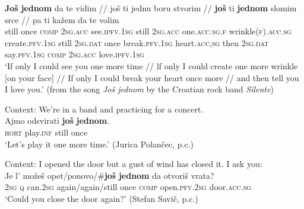 \begin{exe}
	\ex \gll
\textbf{Još} \textbf{jednom} da te vidim // još ti jednu boru stvorim // \textbf{još} ti \textbf{jednom} slomim srce // pa ti kažem da te volim\\
still once \textsc{comp} 2\textsc{sg}.\textsc{acc} see.\textsc{ipfv}.1\textsc{sg} {} still 2\textsc{sg}.\textsc{acc} one.\textsc{acc}.\textsc{sg}.\textsc{f} wrinkle(\textsc{f}).\textsc{acc}.\textsc{sg} create.\textsc{pfv}.1\textsc{sg} {} still 2\textsc{sg}.\textsc{dat} once break.\textsc{pfv}.1\textsc{sg} heart.\textsc{acc},\textsc{sg} {} then 2\textsc{sg}.\textsc{dat} say.\textsc{pfv}.1\textsc{sg} \textsc{comp} 2\textsc{sg}.\textsc{acc} love.\textsc{ipfv}.1\textsc{sg}\\
\glt \lq If only I could see you one more time // lf only I could create one more wrinkle [on your face]  // If only I could break your heart once more // and then tell you I love you.' (from the song \textit{Još jednom} by the Croatian rock band \textit{Silente})

	\ex Context: We're in a band and practicing for a concert.\\
	\gll Ajmo odsvirati \textbf{još} \textbf{jednom}.\\
	\textsc{hort} play.\textsc{inf} still once\\
	\glt \lq Let's play it one more time.' (Jurica Polančec, p.c.)
	
	\pagebreak
	\ex Context: I opened the door but a gust of wind has closed it. I ask you:\label{exappendixBCMSIterativeAdditive}\\
	\gll Je l' možeš opet\textup{/}ponovo\textup{/}\textup{\#}\textbf{još} \textbf{jednom} da otvoriš vrata?\\
	2\textsc{sg} \textsc{q} can.2\textsc{sg}  again/again/still once \textsc{comp} open.\textsc{pfv}.2\textsc{sg} door.\textsc{acc}.\textsc{sg}\\
	\glt \lq Could you close the door again?\rq{ }(Stefan Savič, p.c.)
\end{exe}

